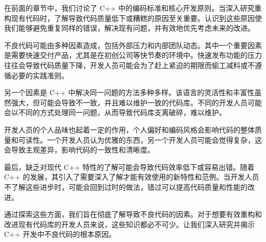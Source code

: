 在前面的章节中，我们讨论了 C++ 中的编码标准和核心开发原则。当深入研究重构现有代码时，了解导致代码质量低下或糟糕的原因至关重要。认识到这些原因使我们能够避免重复同样的错误，解决现有问题，并有效地优先考虑未来的改进。

不良代码可能由多种因素造成，包括外部压力和内部团队动态。其中一个重要因素是需要快速交付产品，尤其是在初创公司等快节奏的环境中。快速发布功能的压力往往会导致代码质量下降，开发人员可能会为了赶上紧迫的期限而偷工减料或不遵循必要的实践准则。

另一个因素是 C++ 中解决同一问题的方法多种多样。该语言的灵活性和丰富性虽然强大，但可能会导致不一致，并且难以维护一致的代码库。不同的开发人员可能会以不同的方式处理同一问题，从而导致代码库支离破碎，难以维护。

开发人员的个人品味也起着一定的作用，个人偏好和编码风格会影响代码的整体质量和可读性。一个开发人员认为优雅的东西，另一个开发人员可能会觉得复杂，这会导致主观差异，影响代码的一致性和清晰度。

最后，缺乏对现代 C++ 特性的了解可能会导致代码效率低下或容易出错。随着 C++ 的发展，其引入了需要深入了解才能有效使用的新特性和范例。当开发人员不了解这些进步时，可能会回到过时的做法，错过可以提高代码质量和性能的改进。

通过探索这些方面，我们旨在彻底了解导致不良代码的因素。对于想要有效重构和改进现有代码库的开发人员来说，这些知识都必不可少。让我们深入研究并揭示 C++ 开发中不良代码的根本原因。

